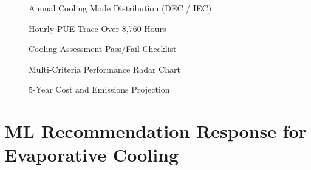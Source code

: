 \documentclass[12pt,a4paper]{report}
\begin{document}
\begin{figure}[H]
\centering
{}
\caption{Annual Cooling Mode Distribution (DEC / IEC)}
\label{fig:evap_modes}
\end{figure}

\begin{figure}[H]
\centering
{}
\caption{Hourly PUE Trace Over 8{,}760 Hours}
\label{fig:evap_pue_hourly}
\end{figure}

\begin{figure}[H]
\centering
{}
\caption{Cooling Assessment Pass/Fail Checklist}
\label{fig:evap_assess_chart}
\end{figure}

\begin{figure}[H]
\centering
{}
\caption{Multi-Criteria Performance Radar Chart}
\label{fig:evap_radar}
\end{figure}

\begin{figure}[H]
\centering
{}
\caption{5-Year Cost and Emissions Projection}
\label{fig:evap_5yr}
\end{figure}

\section{ML Recommendation Response for Evaporative Cooling}
\end{document}
